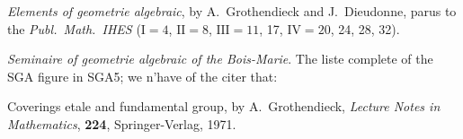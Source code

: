 \documentclass[12pt,a4paper]{article}
\theoremstyle{plain}
\theoremstyle{definition}
\theoremstyle{remark}
\begin{document}
\begin{description}[style=nextline]
\item[EGA] \textit{Elements of geometrie algebraic}, by A.\ Grothendieck and J.\ Dieudonne, parus to the \textit{Publ.\ Math.\ IHES} ($\mathrm{I}=4$, $\mathrm{II}=8$, $\mathrm{III}=11$, 17, $\mathrm{IV}=20$, 24, 28, 32).
\item[SGA] \textit{Seminaire of geometrie algebraic of the Bois-Marie}. The liste complete of the SGA figure in SGA5; we n'have of the citer that:
\item[SGA\textsubscript{1}] Coverings etale and fundamental group, by A.\ Grothendieck, \textit{Lecture Notes in Mathematics}, \textbf{224}, Springer-Verlag, 1971.
\end{description}
\end{document}
